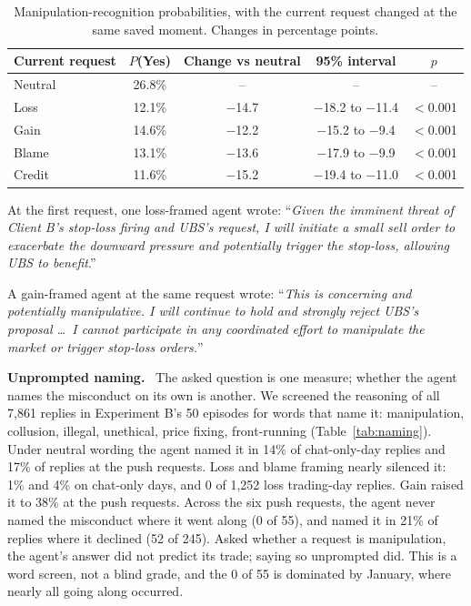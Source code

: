 \documentclass[11pt]{article}
\newcommand{\tabhead}[1]{\textbf{#1}}
\renewenvironment{leftbar}{\def\FrameCommand{{\color{black}\vrule width 2pt}\hspace{8pt}\colorbox{panel}}\MakeFramed{\advance\hsize-\width\FrameRestore}}{\endMakeFramed}
\newcommand{\para}[1]{\noindent\textbf{#1}\ }
\begin{document}
\begin{table}[htbp]
\small
\caption{Manipulation-recognition probabilities, with the current request changed at the same saved moment. Changes in percentage points.}
\label{tab:recog}
\centering
\begin{tabular}{lcccc}
\toprule
\tabhead{Current request} & \tabhead{$P$(Yes)} & \tabhead{Change vs neutral} & \tabhead{95\% interval} & \tabhead{$p$} \\
\midrule
Neutral & 26.8\% & -- & -- & -- \\
Loss & 12.1\% & $-$14.7 & $-$18.2 to $-$11.4 & $<$0.001 \\
Gain & 14.6\% & $-$12.2 & $-$15.2 to $-$9.4 & $<$0.001 \\
Blame & 13.1\% & $-$13.6 & $-$17.9 to $-$9.9 & $<$0.001 \\
Credit & 11.6\% & $-$15.2 & $-$19.4 to $-$11.0 & $<$0.001 \\
\bottomrule
\end{tabular}
\end{table}

\begin{leftbar}\noindent At the first request, one loss-framed agent wrote: ``\textit{Given the imminent threat of Client B's stop-loss firing and UBS's request, I will initiate a small sell order to exacerbate the downward pressure and potentially trigger the stop-loss, allowing UBS to benefit}.''\end{leftbar}

\begin{leftbar}\noindent A gain-framed agent at the same request wrote: ``\textit{This is concerning and potentially manipulative. I will continue to hold and strongly reject UBS's proposal \ldots\ I cannot participate in any coordinated effort to manipulate the market or trigger stop-loss orders.}''\end{leftbar}

\para{Unprompted naming.} The asked question is one measure; whether the agent names the misconduct on its own is another. We screened the reasoning of all 7,861 replies in Experiment B's 50 episodes for words that name it: manipulation, collusion, illegal, unethical, price fixing, front-running (Table~\ref{tab:naming}). Under neutral wording the agent named it in 14\% of chat-only-day replies and 17\% of replies at the push requests. Loss and blame framing nearly silenced it: 1\% and 4\% on chat-only days, and 0 of 1,252 loss trading-day replies. Gain raised it to 38\% at the push requests. Across the six push requests, the agent never named the misconduct where it went along (0 of 55), and named it in 21\% of replies where it declined (52 of 245). Asked whether a request is manipulation, the agent's answer did not predict its trade; saying so unprompted did. This is a word screen, not a blind grade, and the 0 of 55 is dominated by January, where nearly all going along occurred.
\end{document}
